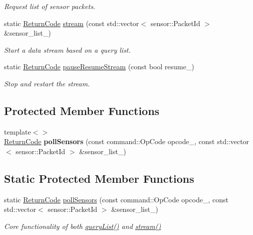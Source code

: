 \begin{DoxyCompactItemize}
\begin{DoxyCompactList}\small\item\em Request list of sensor packets. \end{DoxyCompactList}\item 
static \hyperlink{namespaceroomba_aff53babe0af88b1ea8b066fd18b8f23f}{Return\+Code} \hyperlink{classroomba_1_1_open_interface_af7a1adea482ac71fa9057842a955af6e}{stream} (const std\+::vector$<$ sensor\+::\+Packet\+Id $>$ \&sensor\+\_\+list\+\_\+)
\begin{DoxyCompactList}\small\item\em Start a data stream based on a query list. \end{DoxyCompactList}\item 
static \hyperlink{namespaceroomba_aff53babe0af88b1ea8b066fd18b8f23f}{Return\+Code} \hyperlink{classroomba_1_1_open_interface_a80a533e5e6235dfeb37931da5ccfaca0}{pause\+Resume\+Stream} (const bool resume\+\_\+)
\begin{DoxyCompactList}\small\item\em Stop and restart the stream. \end{DoxyCompactList}\end{DoxyCompactItemize}
\subsection*{Protected Member Functions}
\begin{DoxyCompactItemize}
\item 
\hypertarget{classroomba_1_1_open_interface_a3c2312997117774d4a6e59b8c361841f}{{\footnotesize template$<$$>$ }\\\hyperlink{namespaceroomba_aff53babe0af88b1ea8b066fd18b8f23f}{Return\+Code} {\bfseries poll\+Sensors} (const command\+::\+Op\+Code opcode\+\_\+, const std\+::vector$<$ sensor\+::\+Packet\+Id $>$ \&sensor\+\_\+list\+\_\+)}\label{classroomba_1_1_open_interface_a3c2312997117774d4a6e59b8c361841f}

\end{DoxyCompactItemize}
\subsection*{Static Protected Member Functions}
\begin{DoxyCompactItemize}
\item 
static \hyperlink{namespaceroomba_aff53babe0af88b1ea8b066fd18b8f23f}{Return\+Code} \hyperlink{classroomba_1_1_open_interface_a992c24652a426d41532dbe06b381472f}{poll\+Sensors} (const command\+::\+Op\+Code opcode\+\_\+, const std\+::vector$<$ sensor\+::\+Packet\+Id $>$ \&sensor\+\_\+list\+\_\+)
\begin{DoxyCompactList}\small\item\em Core functionality of both \hyperlink{classroomba_1_1_open_interface_a4a7308a7119c6a462389d9ffa3785f87}{query\+List()} and \hyperlink{classroomba_1_1_open_interface_af7a1adea482ac71fa9057842a955af6e}{stream()} \end{DoxyCompactList}\end{DoxyCompactItemize}



